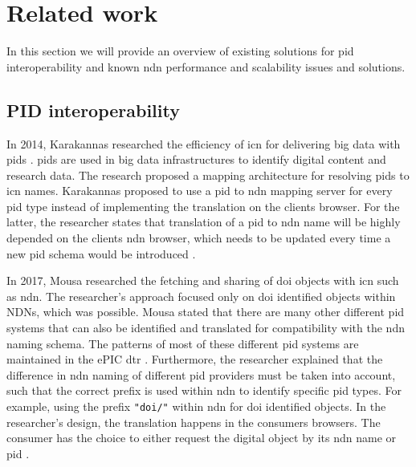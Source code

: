 \section{Related work}
\label{introduction-related-work}

In this section we will provide an overview of existing solutions for \gls{pid} interoperability and known \gls{ndn} performance and scalability issues and solutions.

\subsection{PID interoperability}
\label{introduction-pid}
In 2014, Karakannas researched the efficiency of \gls{icn} for delivering big data with \glspl{pid} \cite{icn-bd}. \glspl{pid} are used in big data infrastructures to identify digital content and research data. The research proposed a mapping architecture for resolving \glspl{pid} to \gls{icn} names. Karakannas proposed to use a \gls{pid} to \gls{ndn} mapping server for every \gls{pid} type instead of implementing the translation on the clients browser. For the latter, the researcher states that translation of a \gls{pid} to \gls{ndn} name will be highly depended on the clients \gls{ndn} browser, which needs to be updated every time a new \gls{pid} schema would be introduced \cite{icn-bd}.

In 2017, Mousa researched the fetching and sharing of \gls{doi} objects with \gls{icn} such as \gls{ndn}. 
The researcher's approach focused only on \gls{doi} identified objects within NDNs, which was possible. Mousa stated that there are many other different \gls{pid} systems that can also be identified and translated for compatibility with the \gls{ndn} naming schema. The patterns of most of these different \gls{pid} systems are maintained in the ePIC \gls{dtr} \cite{dtr}.
 Furthermore, the researcher explained that the difference in \gls{ndn} naming of different \gls{pid} providers must be taken into account, such that the correct prefix is used within \gls{ndn} to identify specific \gls{pid} types. For example, using the prefix \texttt{"doi/"} within \gls{ndn} for \gls{doi} identified objects.
In the researcher's design, the translation happens in the consumers browsers. The consumer has the choice to either request the digital object by its \gls{ndn} name or \gls{pid} \cite{ndn-app-aware}.

